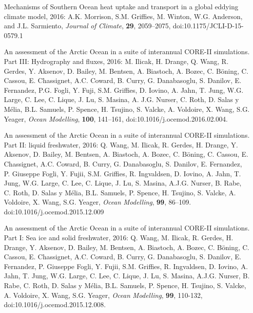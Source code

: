 \begin{etaremune}
\item Mechanisms of Southern Ocean heat uptake and transport in a global eddying climate model, 2016: A.K. Morrison, S.M. Grif\/f\/ies, M. Winton, W.G. Anderson, and J.L. Sarmiento, {\it Journal of Climate}, {\bf 29}, 2059--2075, doi:10.1175/JCLI-D-15-0579.1

\item An assessment of the Arctic Ocean in a suite of interannual  CORE-II simulations. Part III: Hydrography and fluxes, 2016:  M. Ilicak, H. Drange, Q. Wang, R. Gerdes, Y. Aksenov, D. Bailey,  M. Bentsen, A. Biastoch, A. Bozec, C. B\"{o}ning, C. Cassou,  E. Chassignet, A.C. Coward, B. Curry, G. Danabasoglu, S. Danilov,
  E. Fernandez, P.G. Fogli, Y. Fuji, S.M. Grif\/f\/ies,
  D. Iovino, A. Jahn, T. Jung, W.G. Large, C. Lee, C. Lique, J. Lu,  S. Masina, A. J.G. Nurser, C. Roth, D. Salas y M\'{e}lia,  B.L. Samuels, P. Spence, H. Tsujino, S. Valcke, A. Voldoire,  X. Wang, S.G. Yeager, {\it Ocean Modelling}, {\bf 100}, 141--161,
  doi:10.1016/j.ocemod.2016.02.004.

\item An assessment of the Arctic Ocean in a suite of interannual  CORE-II simulations. Part II: liquid freshwater, 2016: Q. Wang,  M. Ilicak, R. Gerdes, H. Drange, Y. Aksenov, D. Bailey, M. Bentsen,  A. Biastoch, A. Bozec, C. B\"{o}ning, C.  Cassou, E. Chassignet,
  A.C. Coward, B. Curry, G. Danabasoglu, S. Danilov, E. Fernandez,  P. Giuseppe Fogli, Y. Fujii, S.M. Grif\/f\/ies, R. Ingvaldsen,  D. Iovino, A. Jahn, T. Jung, W.G. Large, C. Lee, C. Lique, J. Lu,
  S. Masina, A.J.G. Nurser, B. Rabe, C. Roth, D. Salas y M\'elia,  B.L. Samuels, P. Spence, H. Tsujino, S. Valcke, A. Voldoire,  X. Wang, S.G. Yeager, {\it Ocean Modelling}, {\bf 99}, 86--109.  doi:10.1016/j.ocemod.2015.12.009

\item An assessment of the Arctic Ocean in a suite of interannual  CORE-II simulations. Part I: Sea ice and solid freshwater, 2016:  Q. Wang, M. Ilicak, R. Gerdes, H. Drange, Y. Aksenov, D. Bailey,  M. Bentsen, A. Biastoch, A. Bozec, C. B\"{o}ning, C.  Cassou,
  E. Chassignet, A.C. Coward, B. Curry, G. Danabasoglu, S. Danilov,  E. Fernandez, P. Giuseppe Fogli, Y. Fujii, S.M. Grif\/f\/ies,  R. Ingvaldsen, D. Iovino, A. Jahn, T. Jung, W.G. Large, C. Lee,  C. Lique, J. Lu, S. Masina, A.J.G. Nurser, B. Rabe, C. Roth,
  D. Salas y M\'elia, B.L. Samuels, P. Spence, H. Tsujino, S. Valcke,  A. Voldoire, X. Wang, S.G. Yeager, {\it Ocean Modelling}, {\bf 99}, 110-132, doi:10.1016/j.ocemod.2015.12.008.


\end{etaremune}
